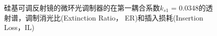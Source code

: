 \begin{figure}[htb]
{\begin{minipage}[]{0.5\textwidth}
		\end{minipage}}		
	\caption{硅基可调反射镜的微环光调制器的在第一耦合系数$k_{s1}$ = 0.0348的透射谱，调制消光比(Extinction Ratio， ER)和插入损耗(Insertion Loss，IL)}
	\label{chapt5_reflactor_modulator_k1_modulator}	
\end{figure}

